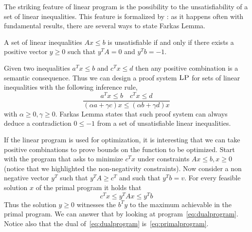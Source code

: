 \documentclass[a4paper,twoside,justified]{tufte-handout}
\begin{document}
The striking feature of linear program is the possibility to
 the unsatisfiability of a set of linear
inequalities. This feature is formalized by : as it happens often with fundamental results, there are
several ways to state Farkas Lemma.

\begin{lemma}
  A set of linear inequalities $ Ax \leq b $ is unsatisfiable if and
  only if there exists a positive vector $ y \geq 0$ such that $
  y^{T}A = 0$ and $y^{T}b = -1$.
\end{lemma}

\begin{marginfigure}
  Given two inequalities $ a^{T}x \leq b $ and $c^{T}x \leq d$ then
  any positive combination is a semantic consequence. Thus we can
  design a proof system $\textsc{LP}$ for sets of linear
  inequalities with the following inference rule,
  \begin{equation*}
    \frac{a^{T}x \leq b \quad c^{T}x \leq d}{(\alpha a + \gamma c)x
      \leq (\alpha b + \gamma d)x  }
  \end{equation*}
  with $\alpha \geq 0, \gamma \geq 0$. Farkas Lemma states that such
  proof system can always deduce a contradiction $ 0 \leq -1 $ from a
  set of unsatisfiable linear inequalities.
\end{marginfigure}

If the linear program is used for optimization, it is interesting that
we can take positive combinations to prove bounds on the function to
be optimized. Start with the  program that asks to minimize $c^{T}x$
under constraints $ Ax \leq b, x\geq 0$ (notice that we highlighted
the non-negativity constraints). Now consider a non negative vector $
y^{T}$ such that $ y^{T}A \geq c^{T}$ and such that $ y^{T}b = v$. For
every feasible solution $ x $ of the primal program it holds that 
\begin{equation}
  c^{T} x \leq y^{T}Ax \leq y^{T} b\tag{weak duality}\label{eq:weak_duality}
\end{equation}
Thus the solution $ y\geq 0 $ witnesses the  $
b^{T}y $ to the maximum achievable in the primal
program.  We can answer
that by looking at 
program~\eqref{eq:dualprogram}. Notice also that the dual
of~\eqref{eq:dualprogram} is~\eqref{eq:primalprogram}.
\end{document}
